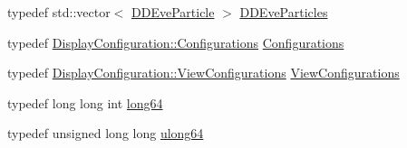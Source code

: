\begin{DoxyCompactItemize}
\item 
typedef std\+::vector$<$ \hyperlink{class_d_d4hep_1_1_d_d_eve_particle}{D\+D\+Eve\+Particle} $>$ \hyperlink{namespace_d_d4hep_a85a43876137cdbe2bd77272afb14586b}{D\+D\+Eve\+Particles}
\item 
typedef \hyperlink{class_d_d4hep_1_1_display_configuration_ac43586ae2c70f106cc9027d452d383d7}{Display\+Configuration\+::\+Configurations} \hyperlink{namespace_d_d4hep_a88b4bb8cba5bc194ed6da21bbb2e4787}{Configurations}
\item 
typedef \hyperlink{class_d_d4hep_1_1_display_configuration_a38d6c82b57ac859a5d5cf67fe26f4920}{Display\+Configuration\+::\+View\+Configurations} \hyperlink{namespace_d_d4hep_a9c889ac82251df068ece7fbba1c2d1c0}{View\+Configurations}
\item 
typedef long long int \hyperlink{namespace_d_d4hep_ac2a70e722b33dc7ddaa20db8954ac836}{long64}
\item 
typedef unsigned long long \hyperlink{namespace_d_d4hep_a7a8348d075fd0a3bafc06de7cde7a750}{ulong64}
\end{DoxyCompactItemize}
